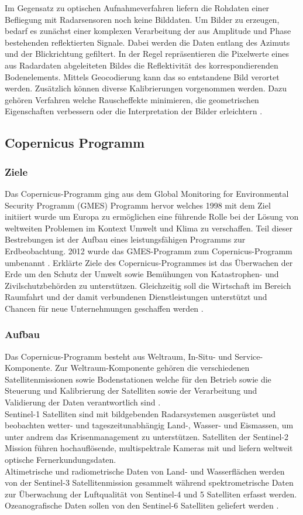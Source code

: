 Im Gegensatz zu optischen Aufnahmeverfahren liefern die Rohdaten 
einer Befliegung mit Radarsensoren noch keine Bilddaten. Um Bilder zu erzeugen, bedarf es zunächst einer komplexen Verarbeitung der aus Amplitude und Phase bestehenden 
reflektierten Signale. Dabei werden die Daten entlang des Azimuts und der Blickrichtung gefiltert. In der Regel repräsentieren die Pixelwerte eines aus Radardaten 
abgeleiteten Bildes die Reflektivität des korrespondierenden Bodenelements. Mittels Geocodierung kann das so entstandene Bild verortet werden. Zusätzlich können diverse 
Kalibrierungen vorgenommen werden. Dazu gehören Verfahren welche Rauscheffekte minimieren, die geometrischen Eigenschaften verbessern oder die Interpretation der Bilder 
erleichtern \cite{tutorial_on_sar}. 

\subsection{Copernicus Programm}
\subsubsection{Ziele}
Das Copernicus-Programm ging aus dem Global Monitoring for Environmental Security Programm (GMES) Programm hervor welches 1998 mit dem Ziel initiiert wurde um Europa 
zu ermöglichen eine führende Rolle bei der Lösung von weltweiten Problemen im Kontext Umwelt und Klima zu verschaffen. Teil dieser Bestrebungen ist der Aufbau eines 
leistungsfähigen Programms zur Erdbeobachtung. 2012 wurde das GMES-Programm zum Copernicus-Programm umbenannt \cite{history_of_copernicus}.
Erklärte Ziele des Copernicus-Programmes ist das Überwachen der Erde um den Schutz der Umwelt sowie Bemühungen von Katastrophen- und Zivilschutzbehörden zu 
unterstützen. Gleichzeitig soll die Wirtschaft im Bereich Raumfahrt und der damit verbundenen Dienstleistungen unterstützt und Chancen für neue Unternehmungen geschaffen
werden \cite{copernicus_regulation}.

\subsubsection{Aufbau}
Das Copernicus-Programm besteht aus Weltraum, In-Situ- und Service-Komponente. 
Zur Weltraum-Komponente gehören die verschiedenen Satellitenmissionen sowie Bodenstationen welche für den Betrieb sowie die Steuerung und Kalibrierung der 
Satelliten sowie der Verarbeitung und Validierung der Daten verantwortlich sind \cite{copernicus_regulation}. \\ 
Sentinel-1 Satelliten sind mit bildgebenden Radarsystemen ausgerüstet und beobachten wetter- und tageszeitunabhängig Land-, Wasser- und Eismassen, um unter andrem das 
Krisenmanagement zu unterstützen.
Satelliten der Sentinel-2 Mission führen hochauflösende, multispektrale Kameras mit und liefern weltweit optische Fernerkundungsdaten. \\
Altimetrische und radiometrische Daten von Land- und Wasserflächen werden von der Sentinel-3 Satellitenmission gesammelt während spektrometrische Daten zur 
Überwachung der Luftqualität von Sentinel-4 und 5 Satelliten erfasst werden.
Ozeanografische Daten sollen von den Sentinel-6 Satelliten geliefert werden \cite{sentinel_overview}.

